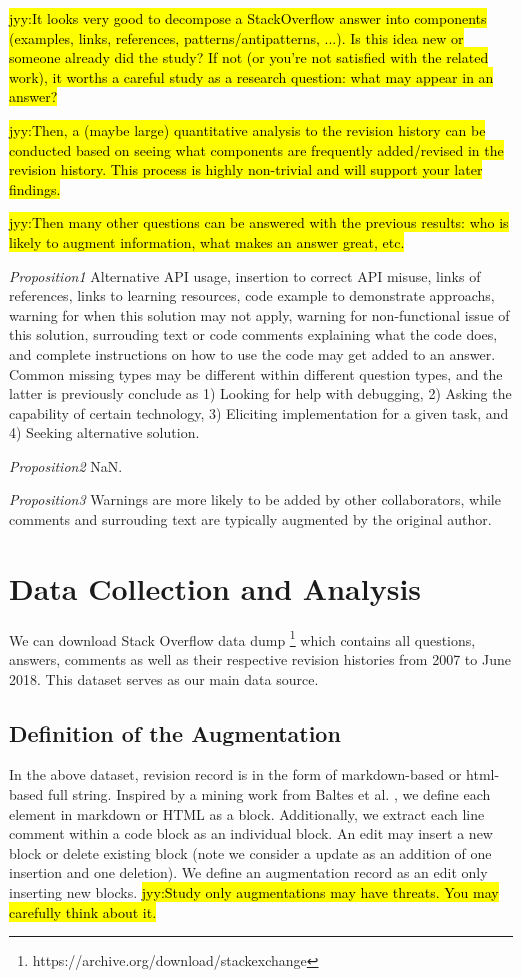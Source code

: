 \documentclass[10pt,conference]{IEEEtran}
\newcommand{\jyy}[1]{\sethlcolor{yellow}\hl{jyy:#1}\xspace}
\begin{document}
\jyy{It looks very good to decompose a StackOverflow answer into components (examples, links, references, patterns/antipatterns, ...). Is this idea new or someone already did the study? If not (or you're not satisfied with the related work), it worths a careful study as a research question: what may appear in an answer?}

\jyy{Then, a (maybe large) quantitative analysis to the revision history can be conducted based on seeing what components are frequently added/revised in the revision history. This process is highly non-trivial and will support your later findings.}

\jyy{Then many other questions can be answered with the previous results: who is likely to augment information, what makes an answer great, etc.}

{\em Proposition1} 
Alternative API usage, insertion to correct API misuse, links of references, links to learning resources, code example to demonstrate approachs, warning for when this solution may not apply, warning for non-functional issue of this solution, surrouding text or code comments explaining what the code does, and complete instructions on how to use the code may get added to an answer. Common missing types may be different within different question types, and the latter is previously conclude as 1) Looking for help with debugging, 2) Asking the capability of certain technology, 3) Eliciting implementation for a given task, and 4) Seeking alternative solution. \cite{DBLP:conf/icsm/NasehiSMB12}   

{\em Proposition2}
NaN.

{\em Proposition3}
Warnings are more likely to be added by other collaborators, while comments and surrouding text are typically augmented by the original author. 



\section {Data Collection and Analysis}
We can download Stack Overflow data dump \footnote{https://archive.org/download/stackexchange} which contains all questions, answers, comments as well as their respective revision histories from 2007 to June 2018. This dataset serves as our main data source.

\subsection {Definition of the Augmentation}
In the above dataset, revision record is in the form of markdown-based or html-based full string. Inspired by a mining work from Baltes et al. \cite{DBLP:journals/corr/abs-1803-07311}, we define each element in markdown or HTML as a block. Additionally, we extract each line comment within a code block as an individual block. An edit may insert a new block or delete existing block (note we consider a update as an addition of one insertion and one deletion). We define an augmentation record as an edit only inserting new blocks. 
\jyy{Study only augmentations may have threats. You may carefully think about it.}
\end{document}
